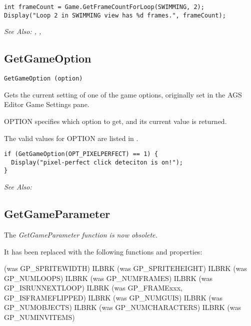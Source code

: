 \begin{verbatim}
int frameCount = Game.GetFrameCountForLoop(SWIMMING, 2);
Display("Loop 2 in SWIMMING view has %d frames.", frameCount);
\end{verbatim}

\it{See Also:} ,
,


\subsection{GetGameOption}\label{GetGameOption}%

\begin{verbatim}
GetGameOption (option)
\end{verbatim}

Gets the current setting of one of the game options, originally set in the AGS Editor
Game Settings pane.

OPTION specifies which option to get, and its current value is returned.

The valid values for OPTION are listed in .

\begin{verbatim}
if (GetGameOption(OPT_PIXELPERFECT) == 1) {
  Display("pixel-perfect click deteciton is on!");
}
\end{verbatim}

\it{See Also:} 



\subsection{GetGameParameter}\label{GetGameParameter}%

The \it{GetGameParameter} function is now obsolete.

It has been replaced with the following functions and properties:

 (was GP_SPRITEWIDTH) ILBRK
 (was GP_SPRITEHEIGHT) ILBRK
 (was GP_NUMLOOPS) ILBRK
 (was GP_NUMFRAMES) ILBRK
 (was GP_ISRUNNEXTLOOP) ILBRK
 (was GP_FRAMExxx, GP_ISFRAMEFLIPPED) ILBRK
 (was GP_NUMGUIS) ILBRK
 (was GP_NUMOBJECTS) ILBRK
 (was GP_NUMCHARACTERS) ILBRK
(was GP_NUMINVITEMS)


